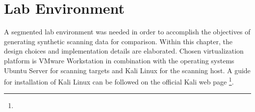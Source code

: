 \section{Lab Environment}
A segmented lab environment was needed in order to accomplish the objectives of generating synthetic scanning data for comparison.
Within this chapter, the design choices and implementation details are elaborated.
Chosen virtualization platform is VMware Workstation in combination with the operating systems Ubuntu Server for scanning targets and Kali Linux for the scanning host.
A guide for installation of Kali Linux can be followed on the official Kali web page \footnote{}.


